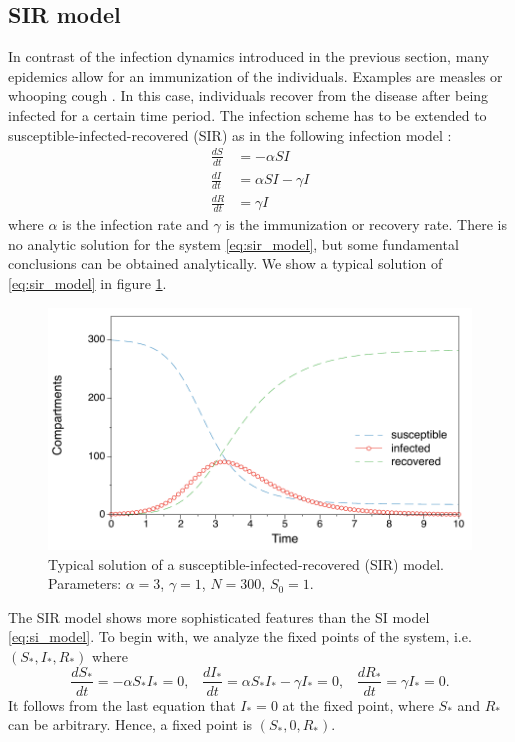 \subsection{SIR model}\label{sec:sir_model}
In contrast of the infection dynamics introduced in the previous section, many epidemics allow for an immunization of the individuals.
Examples are measles or whooping cough \cite{grenfell:92} \cite{andersonmay:92}.
In this case, individuals recover from the disease after being infected for a certain time period.
The infection scheme has to be extended to susceptible-infected-recovered (SIR) as in the following infection model \cite{kermack:27}:
\begin{align}\label{eq:sir_model}
\frac{dS}{dt} &= -\alpha SI \nonumber \\
\frac{dI}{dt} &= \alpha SI -\gamma I \nonumber \\
\frac{dR}{dt} &= \gamma I
\end{align}
where $\alpha $ is the infection rate and $\gamma $ is the immunization or recovery rate.
There is no analytic solution for the system \eqref{eq:sir_model}, but some fundamental conclusions can be obtained analytically.
We show a typical solution of \eqref{eq:sir_model} in figure \ref{fig:std_sir_model}.
\begin{figure}[htbp]
\begin{center}
\includegraphics{images/sir-sol.pdf}
\caption{Typical solution of a susceptible-infected-recovered (SIR) model. Parameters: $\alpha = 3$, $\gamma = 1$, $N=300$, $S_0=1$.}
\label{fig:std_sir_model}
\end{center}
\end{figure}


The SIR model shows more sophisticated features than the SI model \eqref{eq:si_model}.
To begin with, we analyze the fixed points of the system, i.e. $(S_*,I_*,R_*)$ where
\begin{equation}
\frac{dS_*}{dt} = -\alpha S_*I_* =0 ,\; \;\;
\frac{dI_*}{dt} = \alpha S_*I_* -\gamma I_* =0,\; \;\;
\frac{dR_*}{dt} = \gamma I_* = 0.
\end{equation}
It follows from the last equation that $I_*=0$ at the fixed point, where $S_*$ and $R_*$ can be arbitrary.
Hence, a fixed point is $(S_*,0,R_*)$.

